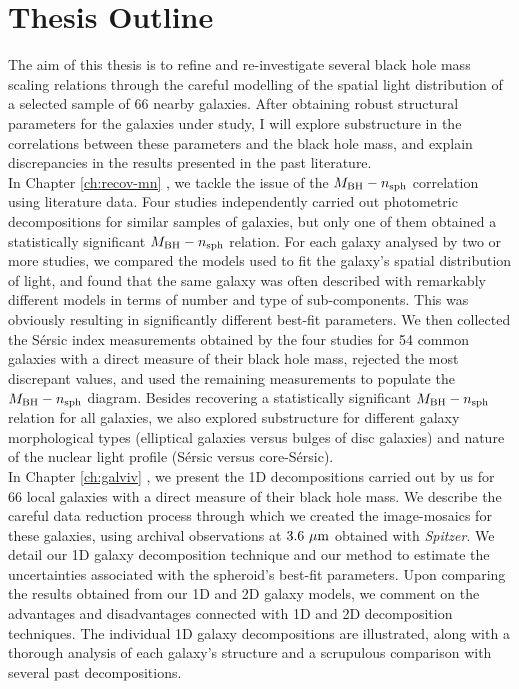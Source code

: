 \section{Thesis Outline}
The aim of this thesis is to refine and re-investigate several black hole mass scaling relations 
through the careful modelling of the spatial light distribution 
of a selected sample of 66 nearby galaxies. 
After obtaining robust structural parameters for the galaxies under study, 
I will explore substructure in the correlations between these parameters and the black hole mass, 
and explain discrepancies in the results presented in the past literature. \\

In Chapter \ref{ch:recov-mn} \citep{savorgnan2013}, 
we tackle the issue of the $M_{\rm BH} - n_{\rm sph}$ correlation using literature data. 
Four studies independently carried out photometric decompositions for similar samples of galaxies, 
but only one of them obtained a statistically significant $M_{\rm BH} - n_{\rm sph}$ relation. 
For each galaxy analysed by two or more studies, 
we compared the models used to fit the galaxy's spatial distribution of light, 
and found that the same galaxy was often described with remarkably different models 
in terms of number and type of sub-components. 
This was obviously resulting in significantly different best-fit parameters. 
We then collected the S\'ersic index measurements obtained by the four studies for 54 common galaxies 
with a direct measure of their black hole mass, 
rejected the most discrepant values, 
and used the remaining measurements to populate the $M_{\rm BH} - n_{\rm sph}$ diagram. 
Besides recovering a statistically significant $M_{\rm BH} - n_{\rm sph}$ relation for all galaxies, 
we also explored substructure for different galaxy morphological types 
(elliptical galaxies versus bulges of disc galaxies)
and nature of the nuclear light profile (S\'ersic versus core-S\'ersic). \\

In Chapter \ref{ch:galviv} \citep{paperI}, 
we present the 1D decompositions carried out by us for 66 local galaxies 
with a direct measure of their black hole mass. 
We describe the careful data reduction process through which 
we created the image-mosaics for these galaxies, 
using archival observations at $3.6~\mu \rm m$ obtained with \emph{Spitzer}. 
We detail our 1D galaxy decomposition technique and our method to estimate the uncertainties 
associated with the spheroid's best-fit parameters. 
Upon comparing the results obtained from our 1D and 2D galaxy models, 
we comment on the advantages and disadvantages connected with 1D and 2D decomposition techniques. 
The individual 1D galaxy decompositions are illustrated, 
along with a thorough analysis of each galaxy's structure 
and a scrupulous comparison with several past decompositions. \\
 
